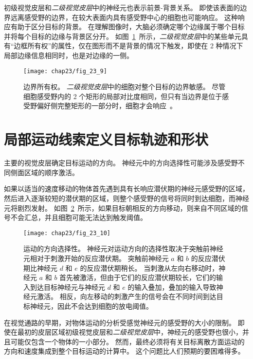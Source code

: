 初级视觉皮层和\textit{二级视觉皮层}中的神经元也表示前景-背景关系。
即使该表面的边界远离感受野的边界，在较大表面内具有感受野中心的细胞也可能响应。
这种响应有助于区分目标的背景。
在理解图像时，大脑必须确定哪个边缘属于哪个目标并将每个目标的边缘与背景区分开。
如图~\ref{fig:23_9}~所示，\textit{二级视觉皮层}中的某些单元具有“边框所有权”的属性，仅在图形而不是背景的情况下触发，即使在 2 种情况下局部边缘信息相同时，也是对边缘的一侧。


\begin{figure}[htbp]
	\centering
	\texttt{[image: chap23/fig\_23\_9]}
	\caption{边界所有权。
		\textit{二级视觉皮层}中的细胞对整个目标的边界敏感。
		尽管细胞感受野内的 2 个矩形的局部对比度相同，但只有当边界是位于感受野偏好侧完整矩形的一部分时，细胞才会响应~\cite{zhou2000coding}。}
	\label{fig:23_9}
\end{figure}



\section{局部运动线索定义目标轨迹和形状}

主要的视觉皮层确定目标运动的方向。
神经元中的方向选择性可能涉及感受野不同侧面区域的顺序激活。


如果以适当的速度移动的物体首先遇到具有长响应潜伏期的神经元感受野的区域，然后进入逐渐较短的潜伏期的区域，则整个感受野的信号将同时到达细胞，而神经元将剧烈发射。
如图~\ref{fig:23_10}~所示，如果目标朝相反的方向移动，则来自不同区域的信号不会汇总，并且细胞可能无法达到触发阈值。


\begin{figure}[htbp]
	\centering
	\texttt{[image: chap23/fig\_23\_10]}
	\caption{运动的方向选择性。
		神经元对运动方向的选择性取决于突触前神经元相对于刺激开始的反应潜伏期。
		突触前神经元 $a$ 和 $b$ 的反应潜伏期比神经元 $d$ 和 $e$ 的反应潜伏期稍长。
		当刺激从左向右移动时，神经元 $a$ 和 $b$ 首先被激活，但由于它们的反应潜伏期较长，它们的输入到达目标神经元与神经元 $d$ 和 $e$ 的输入叠加，叠加的输入导致神经元激活。
		相反，向左移动的刺激产生的信号会在不同时间到达目标神经元，因此不会达到细胞的放电阈值\cite{priebe2008inhibition}。}
	\label{fig:23_10}
\end{figure}


在视觉通路的早期，对物体运动的分析受感觉神经元的感受野的大小的限制。 
即使在最初的皮层区域初级视觉皮层和\textit{二级视觉皮层}中，神经元的感受野也很小，并且可能仅包含一个物体的一小部分。
然而，最终必须将有关目标离散方面运动的方向和速度集成到整个目标运动的计算中。 
这个问题比人们预期的要困难得多。


